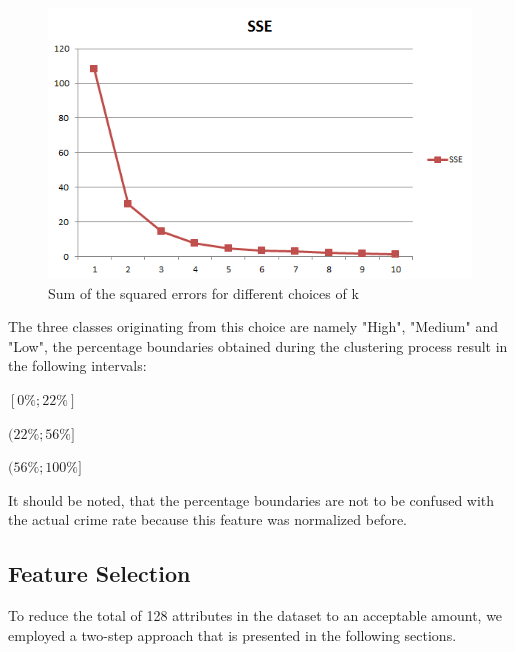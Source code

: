 \begin{figure}[H]
  \centering
  \includegraphics[width=\columnwidth]{../../charts/SSE.png}
  \caption{Sum of the squared errors for different choices of k}
  \label{fig:sse}
\end{figure}
\vspace*{-0.2cm}
\noindent The three classes originating from this choice are namely
"High", "Medium" and "Low", the percentage boundaries obtained during the clustering process result in the following intervals:
\begin{description}
  \setlength{\itemsep}{-2pt}
\item[Low:] \([0\%; 22\%]\) 
\item[Medium:] \((22\%; 56\%]\)
\item[High:] \((56\%; 100\%]\)
\end{description}
It should be noted, that the percentage boundaries are not to be confused with the actual crime rate because this feature was normalized before. 

\subsection{Feature Selection}
\label{sec:feature_selection}    

To reduce the total of 128 attributes in the dataset to an acceptable
amount, we employed a two-step approach that is presented in the
following sections.

